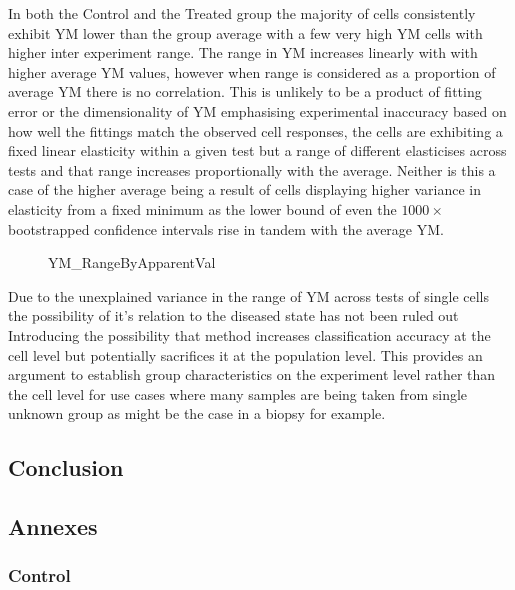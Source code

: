 \documentclass[
  paper=a4,
  ,captions=tableheading
]{scrartcl}
\makeatletter
\newcommand*\pandocbounded[1]{%
  \sbox\pandoc@box{#1}%
  \Gscale@div\@tempa{\textheight}{\dimexpr\ht\pandoc@box+\dp\pandoc@box\relax}%
  \Gscale@div\@tempb{\linewidth}{\wd\pandoc@box}%
  \ifdim\@tempb\p@<\@tempa\p@\let\@tempa\@tempb\fi%
  \ifdim\@tempa\p@<\p@\scalebox{\@tempa}{\usebox\pandoc@box}%
  \else\usebox{\pandoc@box}%
  \fi%
}
\makeatother
\begin{document}
In both the Control and the Treated group the majority of cells
consistently exhibit YM lower than the group average with a few very
high YM cells with higher inter experiment range. The range in YM
increases linearly with with higher average YM values, however when
range is considered as a proportion of average YM there is no
correlation. This is unlikely to be a product of fitting error or the
dimensionality of YM emphasising experimental inaccuracy based on how
well the fittings match the observed cell responses, the cells are
exhibiting a fixed linear elasticity within a given test but a range of
different elasticises across tests and that range increases
proportionally with the average. Neither is this a case of the higher
average being a result of cells displaying higher variance in elasticity
from a fixed minimum as the lower bound of even the \(1000\times\)
bootstrapped confidence intervals rise in tandem with the average YM.

\begin{figure}
\centering
\pandocbounded{}
\caption{YM\_RangeByApparentVal}
\end{figure}

Due to the unexplained variance in the range of YM across tests of
single cells the possibility of it's relation to the diseased state has
not been ruled out Introducing the possibility that method increases
classification accuracy at the cell level but potentially sacrifices it
at the population level. This provides an argument to establish group
characteristics on the experiment level rather than the cell level for
use cases where many samples are being taken from single unknown group
as might be the case in a biopsy for example.

\subsection{Conclusion}\label{conclusion}

\subsection{Annexes}\label{annexes}

\subsubsection{Control}\label{control}
\end{document}
